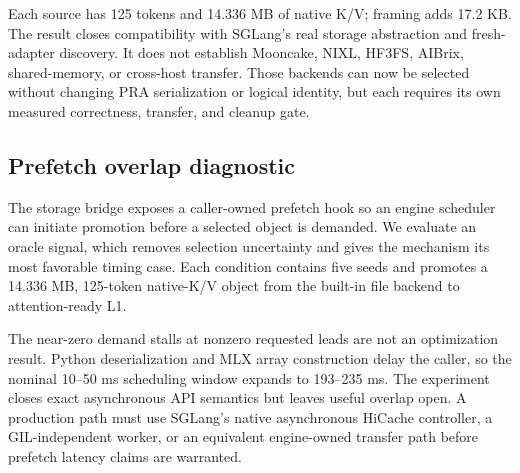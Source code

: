 \documentclass[10pt]{article}
\begin{document}
Each source has 125 tokens and 14.336 MB of native K/V; framing adds 17.2 KB.
The result closes compatibility with SGLang's real storage abstraction and
fresh-adapter discovery. It does not establish Mooncake, NIXL, HF3FS, AIBrix,
shared-memory, or cross-host transfer. Those backends can now be selected
without changing PRA serialization or logical identity, but each requires its
own measured correctness, transfer, and cleanup gate.

\subsection{Prefetch overlap diagnostic}
The storage bridge exposes a caller-owned prefetch hook so an engine scheduler
can initiate promotion before a selected object is demanded. We evaluate an
oracle signal, which removes selection uncertainty and gives the mechanism its
most favorable timing case. Each condition contains five seeds and promotes a
14.336 MB, 125-token native-K/V object from the built-in file backend to
attention-ready L1.

\begin{table}[!htbp]
\centering
\small
\caption{Caller-owned Python-thread prefetch. ``Actual lead'' is elapsed time
before the caller regains control and issues the demand. All 20 restored
tensors are exact. Times are milliseconds.}
\label{tab:sglang-prefetch}
\end{table}

The near-zero demand stalls at nonzero requested leads are not an optimization
result. Python deserialization and MLX array construction delay the caller, so
the nominal 10--50 ms scheduling window expands to 193--235 ms. The experiment
closes exact asynchronous API semantics but leaves useful overlap open. A
production path must use SGLang's native asynchronous HiCache controller, a
GIL-independent worker, or an equivalent engine-owned transfer path before
prefetch latency claims are warranted.
\end{document}
